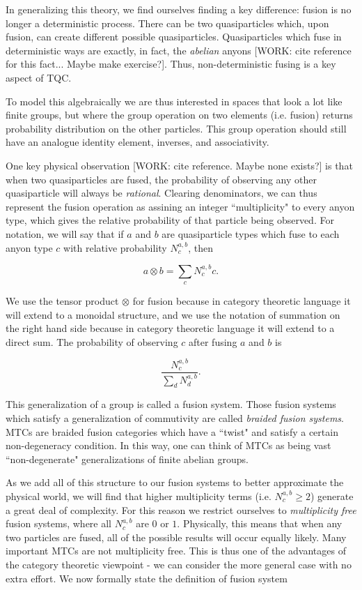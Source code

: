 \documentclass{article}
\theoremstyle{definition}
\numberwithin{figure}{section}
\begin{document}
In generalizing this theory, we find ourselves finding a key difference: fusion is no longer a deterministic process. There can be two quasiparticles which, upon fusion, can create different possible quasiparticles. Quasiparticles which fuse in deterministic ways are exactly, in fact, the \textit{abelian} anyons [WORK: cite reference for this fact... Maybe make exercise?]. Thus, non-deterministic fusing is a key aspect of TQC.

To model this algebraically we are thus interested in spaces that look a lot like finite groups, but where the group operation on two elements (i.e. fusion) returns probability distribution on the other particles. This group operation should still have an analogue identity element, inverses, and associativity.

One key physical observation [WORK: cite reference. Maybe none exists?] is that when two quasiparticles are fused, the probability of observing any other quasiparticle will always be \textit{rational}. Clearing denominators, we can thus represent the fusion operation as assining an integer ``multiplicity" to every anyon type, which gives the relative probability of that particle being observed. For notation, we will say that if $a$ and $b$ are quasiparticle types which fuse to each anyon type $c$ with relative probability $N^{a,b}_{c}$, then

$$a\otimes b = \sum_{c}N^{a,b}_{c}c.$$

We use the tensor product $\otimes$ for fusion because in category theoretic language it will extend to a monoidal structure, and we use the notation of summation on the right hand side because in category theoretic language it will extend to a direct sum. The probability of observing $c$ after fusing $a$ and $b$ is

$$\frac{N^{a,b}_{c}}{\sum_{d}N^{a,b}_{d}}.$$

This generalization of a group is called a fusion system. Those fusion systems which satisfy a generalization of commutivity are called \textit{braided fusion systems}. MTCs are braided fusion categories which have a ``twist" and satisfy a certain non-degeneracy condition. In this way, one can think of MTCs as being vast ``non-degenerate" generalizations of finite abelian groups.

As we add all of this structure to our fusion systems to better approximate the physical world, we will find that higher multiplicity terms (i.e. $N^{a,b}_c\geq 2$) generate a great deal of complexity. For this reason we restrict ourselves to \textit{multiplicity free} fusion systems, where all $N^{a,b}_c$ are $0$ or $1$. Physically, this means that when any two particles are fused, all of the possible results will occur equally likely. Many important MTCs are not multiplicity free. This is thus one of the advantages of the category theoretic viewpoint - we can consider the more general case with no extra effort. We now formally state the definition of fusion system
\end{document}
